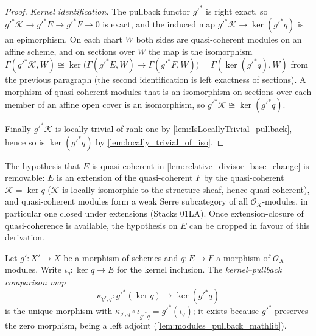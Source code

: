 \begin{proof}
  \emph{Kernel identification.}  The pullback functor \(g'^*\) is right
  exact, so \(g'^* \mathcal K \to g'^* E \to g'^* F \to 0\) is exact, and
  the induced map \(g'^* \mathcal K \to \ker(g'^* q)\) is an epimorphism.
  On each chart \(W\) both sides are quasi-coherent modules on an affine
  scheme, and on sections over \(W\) the map is the isomorphism
  \(\Gamma(g'^* \mathcal K, W) \cong
    \ker\bigl(\Gamma(g'^* E, W) \to \Gamma(g'^* F, W)\bigr)
    = \Gamma(\ker (g'^* q), W)\)
  from the previous paragraph (the second identification is left exactness
  of sections).  A morphism of quasi-coherent modules that is an
  isomorphism on sections over each member of an affine open cover is an
  isomorphism, so \(g'^* \mathcal K \cong \ker(g'^* q)\).

  Finally \(g'^* \mathcal K\) is locally trivial of rank one by
  \cref{lem:IsLocallyTrivial_pullback}, hence so is \(\ker(g'^* q)\) by
  \cref{lem:locally_trivial_of_iso}.
\end{proof}

\begin{remark}
  \label{rem:relative_divisor_base_change_qcoh_removable}
  The hypothesis that \(E\) is quasi-coherent in
  \cref{lem:relative_divisor_base_change} is removable: \(E\) is an
  extension of the quasi-coherent \(F\) by the quasi-coherent
  \(\mathcal K = \ker q\) (\(\mathcal K\) is locally isomorphic to the
  structure sheaf, hence quasi-coherent), and quasi-coherent modules form a
  weak Serre subcategory of all \(\mathcal O_X\)-modules, in particular one
  closed under extensions (Stacks 01LA). Once extension-closure of
  quasi-coherence is available, the hypothesis on \(E\) can be dropped in
  favour of this derivation.
\end{remark}

\begin{definition}
  \label{def:pullback_kernel_comparison}
  \leanok
  Let \(g' : X' \to X\) be a morphism of schemes and \(q : E \to F\) a
  morphism of \(\mathcal O_X\)-modules. Write \(\iota_q : \ker q \to E\) for
  the kernel inclusion. The \emph{kernel--pullback comparison map}
  \[
    \kappa_{g',q} : g'^{*}(\ker q) \longrightarrow \ker(g'^{*} q)
  \]
  is the unique morphism with
  \(\kappa_{g',q} \circ \iota_{g'^{*}q} = g'^{*}(\iota_q)\); it exists
  because \(g'^{*}\) preserves the zero morphism, being a left adjoint
  (\cref{lem:modules_pullback_mathlib}).
\end{definition}

